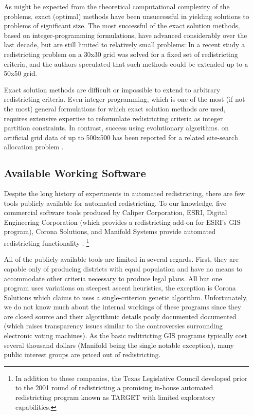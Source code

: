 \documentclass[article]{JSSstyle/jss}
\begin{document}
As might be expected from the theoretical computational complexity 
of the problems, exact (optimal) methods have been 
unsuccessful in yielding solutions to problems of significant size. 
The most successful of the exact solution methods, based on 
integer-programming formulations, have advanced considerably over 
the last decade, but are still limited to relatively small problems: 
In a recent study a redistricting problem on a 30x30 grid was solved  
\citep[][]{AerEisHeu03} for a fixed set of redistricting 
criteria, and the authors speculated that such methods could be 
extended up to a 50x50 grid. 

Exact solution methods are difficult or impossible to extend to 
arbitrary redistricting criteria. Even integer programming, which is 
one of the most (if not the most) general formulations for which 
exact solution methods are used, requires extensive expertise to reformulate 
redistricting criteria as integer partition constraints.  In contrast, success 
using evolutionary algorithms. on artificial grid data of up to 
500x500 has been reported for a related site-search allocation 
problem \citep[][]{Xiao06}.

\subsection{Available Working Software}

Despite the long history of experiments in automated redistricting, 
there are few tools publicly available for automated redistricting. 
To our knowledge, five commercial software tools produced by Caliper 
Corporation, ESRI, Digital Engineering Corporation (which provides 
a redistricting add-on for ESRI's GIS program), Corona Solutions, 
and Manifold Systems provide automated redistricting functionality 
\citep[][]{AltMacMcD05}.  \footnote{In addition to these companies, 
the Texas Legislative Council developed prior to the 2001 round of redistricting a promising in-house 
automated redistricting program known as TARGET with limited exploratory
capabilities.}   

All of the publicly available tools are limited in several regards.  
First, they are capable only of producing districts with equal 
population and have no means to accommodate other criteria necessary 
to produce legal plans.  All but one program uses variations on 
steepest ascent heuristics, the exception is Corona Solutions which 
claims to uses a single-criterion genetic algorithm.  Unfortunately, we do not know 
much about the internal workings of these programs since they are 
closed source and their algorithmic details pooly documented documented (which raises transparency issues 
similar to the controversies surrounding electronic voting machines).  
As the basic reditricting GIS programs typically cost several thousand dollars (Manifold being the single notable exception), many public interest groups are priced out of redistricting.  
\end{document}
